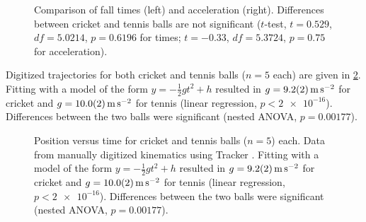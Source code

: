 \documentclass[reprint,amsmath,amssymb,aps,twoside]{revtex4-2}
\begin{document}



\begin{figure}
\begin{center}

\end{center}
\caption{Comparison of fall times (left) and acceleration (right). Differences between cricket and tennis balls are not significant ($t$-test, $t=0.529$, $df=5.0214$, $p=0.6196$ for times; $t=-0.33$, $df=5.3724$, $p=0.75$ for acceleration).}
\label{fig:5}
\end{figure}


Digitized trajectories for both cricket and tennis balls ($n=5$ each) are given in \cref{fig:41}. Fitting with a model of the form $y=-\frac{1}{2}g t^2+h$ resulted in $g=\qty{9.2\pm0.2}{\meter\per\second\squared}$ for cricket and $g=\qty{10.0\pm0.2}{\meter\per\second\squared}$ for tennis (linear regression, $p<\num{2e-16}$). Differences between the two balls were significant (nested ANOVA, $p=0.00177$). 
\begin{figure}  
\begin{center}

\end{center}
\caption{Position versus time for cricket and tennis balls ($n=5$) each. Data from manually digitized kinematics using Tracker \cite{tracker}. Fitting with a model of the form $y=-\frac{1}{2}g t^2+h$ resulted in $g=\qty{9.2\pm0.2}{\meter\per\second\squared}$ for cricket and $g=\qty{10.0\pm0.2}{\meter\per\second\squared}$ for tennis (linear regression, $p<\num{2e-16}$). Differences between the two balls were significant (nested ANOVA, $p=0.00177$).}
\label{fig:41}
\end{figure}
\end{document}
